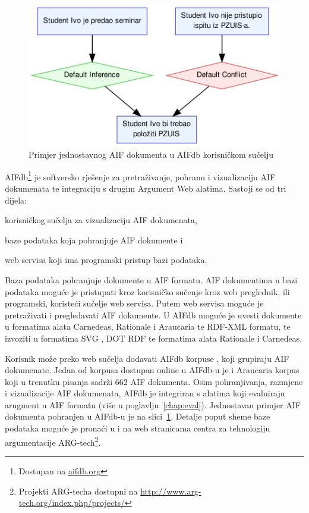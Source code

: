\begin{figure}
    \centering
    \includegraphics[scale=0.8]{aifdb_ex.png}
\caption{Primjer jednostavnog AIF dokumenta u AIFdb korisničkom sučelju}
\label{fig:aifdb_ex}
\end{figure}

AIFdb\footnote{Dostupan na \url{aifdb.org}} \citep{lawrence2012aifdb} 
je softversko rješenje za pretraživanje, pohranu i vizualizaciju AIF dokumenata te
integraciju s drugim Argument Web alatima. 
Sastoji se od tri dijela:
\begin{enumerate*}
    \item korisničkog sučelja za vizualizaciju AIF dokumenata,
    \item baze podataka koja pohranjuje AIF dokumente i
    \item web servisa koji ima programski pristup bazi podataka.
\end{enumerate*}
Baza podataka pohranjuje dokumente u AIF formatu. 
AIF dokumentima u bazi podataka moguće je pristupati kroz korisničko sučenje 
kroz web preglednik, ili programski, koristeći sučelje web servisa.  
Putem web servisa moguće je pretraživati i pregledavati AIF dokumente. 
U AIFdb moguće je uvesti  dokumente u formatima alata 
Carnedeas, Rationale i Araucaria te RDF-XML formatu, te izvoziti 
u formatima SVG , DOT 
RDF te formatima alata Rationale i Carnedeas. 

Korisnik može preko web sučelja dodavati AIFdb korpuse \citep{lawrence2014aifdb}, 
koji grupiraju AIF dokumenate. 
Jedan od korpusa dostupan online u AIFdb-u je i Araucaria korpus koji 
u trenutku pisanja sadrži 662 AIF dokumenta. 
Osim pohranjivanja, razmjene i vizualizacije AIF dokumenata, AIFdb je integriran 
s alatima koji evaluiraju arugment u AIF formatu (više u poglavlju~\ref{chap:eval}). 
Jednostavan primjer AIF dokumenta
pohranjen u AIFdb-u je na slici~\ref{fig:aifdb_ex}. Detalje poput sheme 
baze podataka moguće je pronaći u \citep{lawrence2014aifdb} i na web stranicama
centra za tehnologiju argumentacije  
ARG-tech\footnote{Projekti ARG-techa dostupni na \url{http://www.arg-tech.org/index.php/projects/}}.




